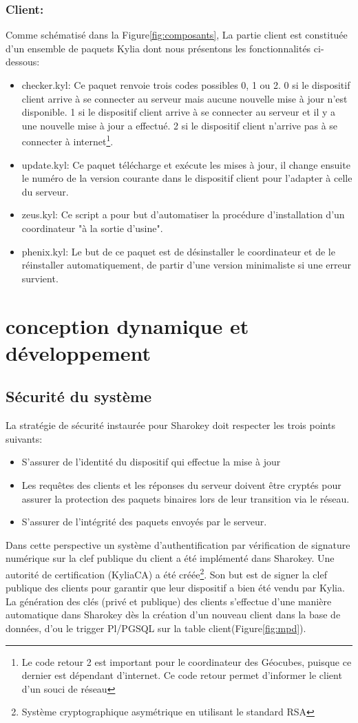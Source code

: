 \documentclass{themeensg}
\begin{document}
\subsubsection{Client:}
Comme schématisé dans la Figure\ref{fig:composants}, La partie client est constituée d'un ensemble de paquets Kylia dont nous présentons les fonctionnalités ci-dessous:
\begin{itemize}
\item checker.kyl: Ce paquet renvoie trois codes possibles 0, 1 ou 2. 0 si le dispositif client arrive à se connecter au serveur mais aucune nouvelle mise à jour n'est disponible. 1 si le dispositif client arrive à se connecter au serveur et il y a une nouvelle mise à jour a effectué. 2 si le dispositif client n'arrive pas à se connecter à internet\footnote{Le code retour 2 est important pour le coordinateur des Géocubes, puisque ce dernier est dépendant d'internet. Ce code retour permet d'informer le client d'un souci de réseau}.
\item update.kyl: Ce paquet télécharge et exécute les mises à jour, il change ensuite le numéro de la version courante dans le dispositif client pour l'adapter à celle du serveur.
\item zeus.kyl: Ce script a pour but d'automatiser la procédure d'installation d'un coordinateur "à la sortie d'usine".
\item phenix.kyl: Le but de ce paquet est de désinstaller le coordinateur et de le réinstaller automatiquement, de partir d'une version minimaliste si une erreur survient.
\end{itemize}
\section{conception dynamique et développement}

\subsection{Sécurité du système}
La stratégie de sécurité instaurée pour Sharokey doit respecter les trois points suivants:
\begin{itemize}
\item S'assurer de l'identité du dispositif qui effectue la mise à jour
\item Les requêtes des clients et les réponses du serveur doivent être cryptés pour assurer la protection des paquets binaires lors de leur transition via le réseau.
\item S'assurer de l'intégrité des paquets envoyés par le serveur.
\end{itemize}
Dans cette perspective un système d'authentification par vérification de signature numérique sur la clef publique du client a été implémenté dans Sharokey. Une autorité de certification (KyliaCA) a été créée\footnote{Système cryptographique asymétrique en utilisant le standard RSA}. Son but est de signer la clef publique des clients pour garantir que leur dispositif a bien été vendu par Kylia. La génération des clés (privé et publique) des clients s'effectue d'une manière automatique dans Sharokey dès la création d'un nouveau client dans la base de données, d'ou le trigger Pl/PGSQL sur la table client(Figure\ref{fig:mpd}).
\end{document}
